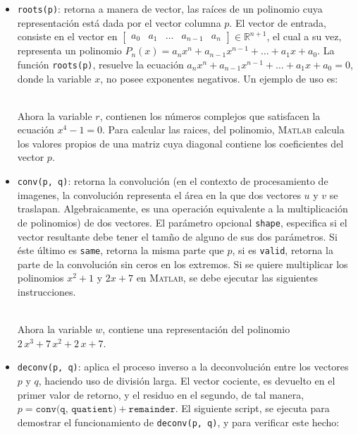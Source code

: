 \documentclass[11pt, spanish]{article}
\begin{document}
\begin{itemize}

\item \texttt{roots(p)}: retorna a manera de vector, las raíces de un polinomio cuya representación está dada por el vector columna $p$. El vector de entrada, consiste en el vector en $\begin{bmatrix} a_{0} & a_{1}  & \dots & a_{n - 1} & a_n 
\end{bmatrix} \in \mathbb{R}^{n+1}$, el cual a su vez, representa un polinomio $P_n(x) = a_nx^n + a_{n-1}x^{n-1} + \dots + a_{1}x + a_{0}$. La función \texttt{roots(p)}, resuelve la ecuación $a_nx^n + a_{n-1}x^{n-1} + \dots + a_{1}x + a_{0} = 0$, donde la variable $x$, no posee exponentes negativos. Un ejemplo de uso es: \\

\

Ahora la variable $r$, contienen los números complejos que satisfacen la ecuación $x^4 - 1 = 0$. Para calcular las raices, del polinomio, \textsc{Matlab} calcula los valores propios de una matriz cuya diagonal contiene los coeficientes del vector $p$.

\item \texttt{conv(p, q)}: retorna la convolución (en el contexto de procesamiento de imagenes, la convolución representa el área en la que dos vectores $u$ y $v$ se traslapan. Algebraicamente, es una operación equivalente a la multiplicación de polinomios) de dos vectores. El parámetro opcional \texttt{shape}, especifica si el vector resultante debe tener el tamño de alguno de sus dos parámetros. Si éste último es \texttt{same}, retorna la misma parte que $p$, si es \texttt{valid}, retorna la parte de la convolución sin ceros en los extremos. Si se quiere multiplicar los polinomios $x^2+1$ y $2x + 7$ en \textsc{Matlab}, se debe ejecutar las siguientes instrucciones.\\

\

Ahora la variable $w$, contiene una representación del polinomio $2\, x^3 + 7\, x^2 + 2\, x + 7$.

\item \texttt{deconv(p, q)}: aplica el proceso inverso a la deconvolución entre los vectores $p$ y $q$, haciendo uso de división larga. El vector cociente, es devuelto en el primer valor de retorno, y el residuo en el segundo, de tal manera, $p = \texttt{conv(q, quatient)} + \texttt{remainder}$. El siguiente script, se ejecuta para demostrar el funcionamiento de \texttt{deconv(p, q)}, y para verificar este hecho:\\


\end{itemize}
\end{document}
